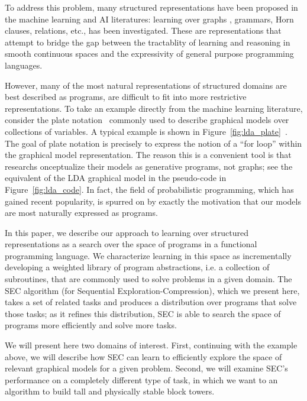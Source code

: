 \documentclass{article} %
\begin{document}
To address this problem, many structured representations have been proposed in the machine learning and AI literatures: learning over graphs \cite{}, grammars\cite{}, Horn clauses\cite{}, relations{}, etc., has been investigated. These are representations that attempt to bridge the gap between the tractablity of learning and reasoning in smooth continuous spaces and the expressivity of general purpose programming languages. 

However, many of the most natural representations of structured domains are best described as programs, are difficult to fit into more restrictive representations.  To take an example directly from the machine learning literature, consider the plate notation~\cite{DBLP:journals/jair/Buntine94} commonly used to describe graphical models over collections of variables. A typical example is shown in Figure~\ref{fig:lda_plate}~\cite{DBLP:journals/jmlr/BleiNJ03}. The goal of plate notation is precisely to express the notion of a ``for loop'' within the graphical model representation. The reason this is a convenient tool is that researchs onceptualize their models as generative programs, not graphs; see the equivalent of the LDA graphical model in the pseudo-code in Figure~\ref{fig:lda_code}. In fact, the field of probabilistic programming, which has gained recent popularity, is spurred on by exactly the motivation that our models are most naturally expressed as programs. 

In this paper, we describe our approach to learning over structured representations as a search over the space of programs in a functional programming language. We characterize learning in this space as incrementally developing a weighted library of program abstractions, i.e. a collection of subroutines, that are commonly used to solve problems in a given domain. The SEC algorithm (for Sequential Exploration-Compression), which we present here, takes a set of related tasks and produces a distribution over programs that solve those tasks; as it refines this distribution, SEC is able to search the space of programs more efficiently and solve more tasks. 

We will present here two domains of interest. First, continuing with the example above, we will describe how SEC can learn to efficiently explore the space of relevant graphical models for a given problem. Second, we will examine SEC's performance on a completely different type of task, in which we want to an algorithm to build tall and physically stable block towers. 
\end{document}
